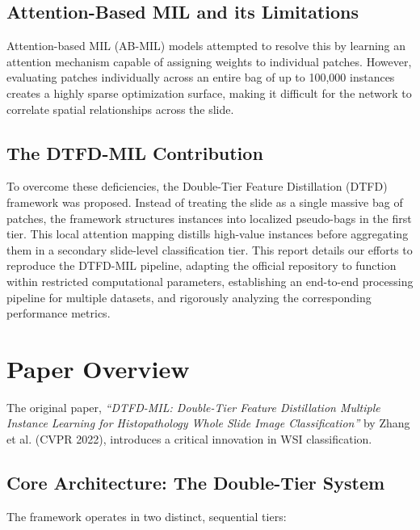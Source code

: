 \documentclass[11pt,a4paper]{article}
\begin{document}
\subsection{Attention-Based MIL and its Limitations}
Attention-based MIL (AB-MIL) models attempted to resolve this by learning an attention mechanism capable of assigning weights to individual patches. However, evaluating patches individually across an entire bag of up to 100,000 instances creates a highly sparse optimization surface, making it difficult for the network to correlate spatial relationships across the slide.

\subsection{The DTFD-MIL Contribution}
To overcome these deficiencies, the Double-Tier Feature Distillation (DTFD) framework was proposed. Instead of treating the slide as a single massive bag of patches, the framework structures instances into localized pseudo-bags in the first tier. This local attention mapping distills high-value instances before aggregating them in a secondary slide-level classification tier. This report details our efforts to reproduce the DTFD-MIL pipeline, adapting the official repository to function within restricted computational parameters, establishing an end-to-end processing pipeline for multiple datasets, and rigorously analyzing the corresponding performance metrics.

\section{Paper Overview}
The original paper, \textit{“DTFD-MIL: Double-Tier Feature Distillation Multiple Instance Learning for Histopathology Whole Slide Image Classification”} by Zhang et al. (CVPR 2022), introduces a critical innovation in WSI classification.

\subsection{Core Architecture: The Double-Tier System}
The framework operates in two distinct, sequential tiers:
\end{document}
